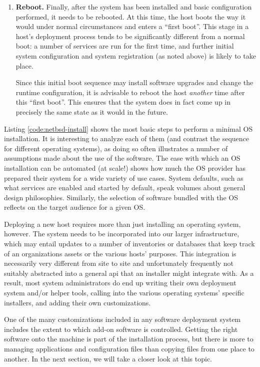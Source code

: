 \begin{enumerate}
	\item {\bf Reboot.}  Finally, after the system has been installed
		and basic configuration performed, it needs to be
		rebooted.  At this time, the host boots the way it would
		under normal circumstances and enters a ``first boot''.
		This stage in a host's deployment process tends to be
		significantly different from a normal boot:  a number of
		services are run for the first time, and further initial
		system configuration and system registration (as noted
		above) is likely to take place.

		Since this initial boot sequence may install software
		upgrades and change the runtime configuration, it is
		advisable to reboot the host {\em another} time
		after this ``first boot''.  This ensures that the system
		does in fact come up in precisely the same state as it
		would in the future.

\end{enumerate}

Listing \ref{code:netbsd-install} shows the most basic
steps to perform a minimal OS installation.  It is
interesting to analyze each of them (and contrast the
sequence for different operating systems), as doing so
often illustrates a number of assumptions made about
the use of the software.  The ease with which an OS
installation can be automated (at scale!) shows how
much the OS provider has prepared their system for a
wide variety of use cases.  System defaults, such as
what services are enabled and started by default,
speak volumes about general design philosophies.
Similarly, the selection of software bundled with the
OS reflects on the target audience for a given OS.

Deploying a new host requires more than just
installing an operating system, however.  The system
needs to be incorporated into our larger
infrastructure, which may entail updates to a number
of inventories or databases that keep track of an
organizations assets or the various hosts' purposes.
This integration is necessarily very different from
site to site and unfortunately frequently not suitably
abstracted into a general \gls{api} that an installer
might integrate with.  As a result, most system
administrators do end up writing their own deployment
system and/or helper tools, calling into the various
operating systems' specific installers, and adding
their own customizations.

One of the many customizations included in any
software deployment system includes the extent to
which add-on software is controlled.  Getting the
right software onto the machine is part of the
installation process, but there is more to managing
applications and configuration files than copying
files from one place to another.  In the next section,
we will take a closer look at this topic.

